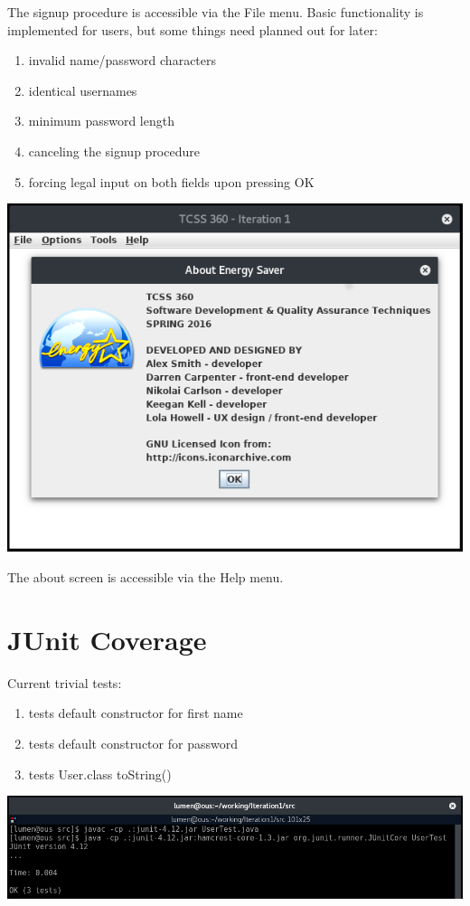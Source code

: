 \documentclass[paper=a4, fontsize=11pt]{scrartcl} %
\numberwithin{equation}{section} %
\numberwithin{figure}{section} %
\numberwithin{table}{section} %
\begin{document}
The signup procedure is accessible via the File menu.  Basic functionality is implemented for users, but some things need planned out for later:
\begin{enumerate}
\item invalid name/password characters
\item identical usernames
\item minimum password length
\item canceling the signup procedure
\item forcing legal input on both fields upon pressing OK
\end{enumerate}


\begin{center}
\includegraphics[scale=0.4]{about.png}
\end{center}

The about screen is accessible via the Help menu.

\section{JUnit Coverage}

Current trivial tests:

\begin{enumerate}
\item tests default constructor for first name
\item tests default constructor for password
\item tests User.class toString()
\end{enumerate}

\begin{center}
\includegraphics[scale=0.45]{junit.png}
\end{center}
\end{document}
